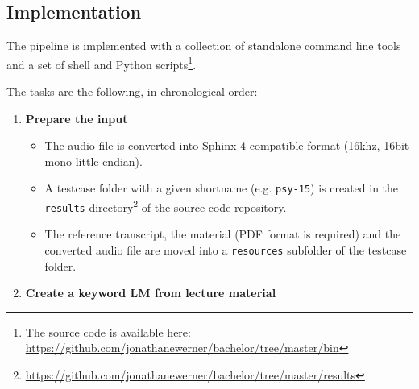 \documentclass[]{article}
\providecommand{\tightlist}{%
  \setlength{\itemsep}{0pt}\setlength{\parskip}{0pt}}
\begin{document}
\subsection{Implementation}\label{implementation}

The pipeline is implemented with a collection of standalone command line
tools and a set of shell and Python scripts\footnote{The source code is
  available here:
  \url{https://github.com/jonathanewerner/bachelor/tree/master/bin}}.

The tasks are the following, in chronological order:

\begin{enumerate}
\def\labelenumi{\arabic{enumi}.}
\item
  \textbf{Prepare the input}

  \begin{itemize}
  \tightlist
  \item
    The audio file is converted into Sphinx 4 compatible format (16khz,
    16bit mono little-endian).
  \item
    A testcase folder with a given shortname (e.g. \texttt{psy-15}) is
    created in the \texttt{results}-directory\footnote{\url{https://github.com/jonathanewerner/bachelor/tree/master/results}}
    of the source code repository.
  \item
    The reference transcript, the material (PDF format is required) and
    the converted audio file are moved into a \texttt{resources}
    subfolder of the testcase folder.
  \end{itemize}
\item
  \textbf{Create a keyword LM from lecture material}


\end{enumerate}
\end{document}

